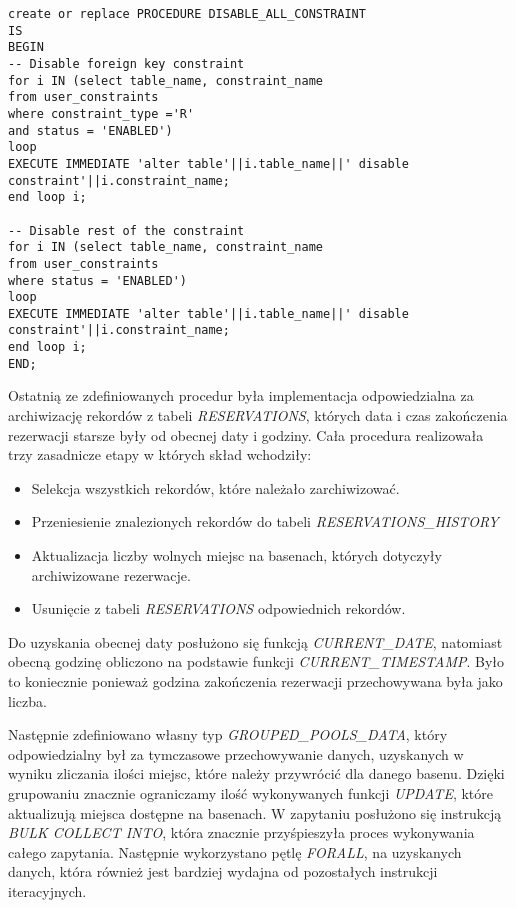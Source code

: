 \documentclass[a4paper]{article}
\begin{document}
\newpage

\begin{verbatim}
create or replace PROCEDURE DISABLE_ALL_CONSTRAINT
IS
BEGIN
-- Disable foreign key constraint
for i IN (select table_name, constraint_name
from user_constraints
where constraint_type ='R'
and status = 'ENABLED')
loop
EXECUTE IMMEDIATE 'alter table'||i.table_name||' disable constraint'||i.constraint_name;
end loop i;

-- Disable rest of the constraint
for i IN (select table_name, constraint_name
from user_constraints
where status = 'ENABLED')
loop
EXECUTE IMMEDIATE 'alter table'||i.table_name||' disable constraint'||i.constraint_name;
end loop i;
END;

\end{verbatim}

Ostatnią ze zdefiniowanych procedur była implementacja odpowiedzialna za archiwizację rekordów z tabeli \textit{RESERVATIONS}, których data i czas zakończenia rezerwacji starsze były od obecnej daty i godziny.  Cała procedura realizowała trzy zasadnicze etapy w których skład wchodziły:
\begin{itemize}
    \item Selekcja wszystkich rekordów, które należało zarchiwizować.
    \item Przeniesienie znalezionych rekordów do tabeli \textit{RESERVATIONS\_HISTORY}
    \item Aktualizacja liczby wolnych miejsc na basenach, których dotyczyły archiwizowane rezerwacje.
    \item Usunięcie z tabeli \textit{RESERVATIONS} odpowiednich rekordów.
\end{itemize}

Do uzyskania obecnej daty posłużono się funkcją \textit{CURRENT\_DATE}, natomiast obecną godzinę obliczono na podstawie funkcji \textit{CURRENT\_TIMESTAMP}. Było to koniecznie ponieważ godzina zakończenia rezerwacji przechowywana była jako liczba.

Następnie zdefiniowano własny typ \textit{ GROUPED\_POOLS\_DATA}, który odpowiedzialny był za tymczasowe przechowywanie danych, uzyskanych w wyniku zliczania ilości miejsc, które należy przywrócić dla danego basenu. Dzięki grupowaniu znacznie ograniczamy ilość wykonywanych funkcji \textit{UPDATE}, które aktualizują miejsca dostępne na basenach. W zapytaniu posłużono się instrukcją \textit{BULK COLLECT INTO}, która znacznie przyśpieszyła proces wykonywania całego zapytania. Następnie wykorzystano pętlę \textit{FORALL}, na uzyskanych danych, która również jest bardziej wydajna od pozostałych instrukcji iteracyjnych.
\end{document}
